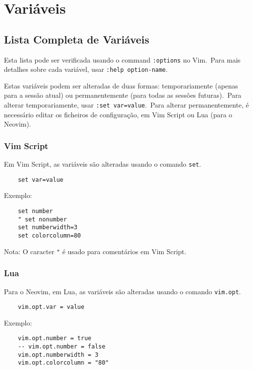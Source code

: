 \chapter{Variáveis}
\label{chap:variaveis}

\section{Lista Completa de Variáveis}

Esta lista pode ser verificada usando o command \texttt{:options} no Vim.\ Para mais detalhes sobre cada variável, usar \texttt{:help option-name}.

Estas variáveis podem ser alteradas de duas formas: temporariamente (apenas para a sessão atual) ou permanentemente (para todas as sessões futuras).\ Para alterar temporariamente, usar \texttt{:set var=value}.\ Para alterar permanentemente, é necessário editar os ficheiros de configuração, em Vim Script ou Lua (para o Neovim).

\subsection*{Vim Script}

Em Vim Script, as variáveis são alteradas usando o comando \texttt{set}.

\begin{verbatim}
    set var=value
\end{verbatim}

Exemplo:

\begin{verbatim}
    set number
    " set nonumber
    set numberwidth=3
    set colorcolumn=80
\end{verbatim}

Nota: O caracter \texttt{"} é usado para comentários em Vim Script.

\subsection*{Lua}

Para o Neovim, em Lua, as variáveis são alteradas usando o comando \texttt{vim.opt}.

\begin{verbatim}
    vim.opt.var = value
\end{verbatim}

Exemplo:

\begin{verbatim}
    vim.opt.number = true
    -- vim.opt.number = false
    vim.opt.numberwidth = 3
    vim.opt.colorcolumn = "80"
\end{verbatim}

